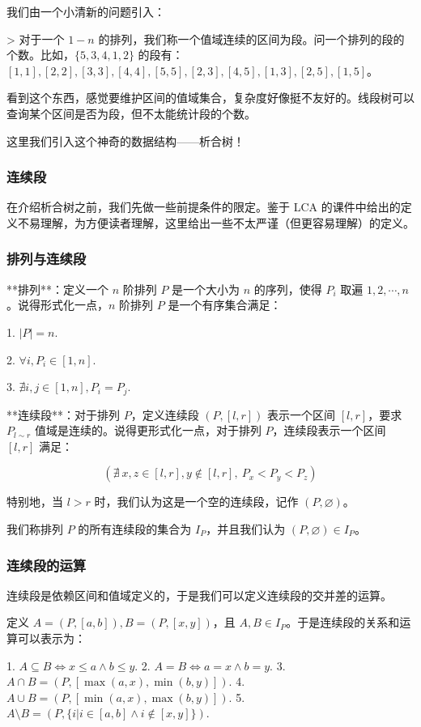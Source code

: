 \documentclass[12pt]{ctexart}
\begin{document}
我们由一个小清新的问题引入：

> 对于一个 $1-n$ 的排列，我们称一个值域连续的区间为段。问一个排列的段的个数。比如，$\{5 ,3 ,4, 1 ,2\}$ 的段有：$[1,1],[2,2],[3,3],[4,4],[5,5],[2,3],[4,5],[1,3],[2,5],[1,5]$。

看到这个东西，感觉要维护区间的值域集合，复杂度好像挺不友好的。线段树可以查询某个区间是否为段，但不太能统计段的个数。

这里我们引入这个神奇的数据结构——析合树！

\subsubsection{连续段}

在介绍析合树之前，我们先做一些前提条件的限定。鉴于 LCA 的课件中给出的定义不易理解，为方便读者理解，这里给出一些不太严谨（但更容易理解）的定义。

\subsubsection{排列与连续段}

**排列**：定义一个 $n$ 阶排列 $P$ 是一个大小为 $n$ 的序列，使得 $P_i$ 取遍 $1,2,\cdots,n$。说得形式化一点，$n$ 阶排列 $P$ 是一个有序集合满足：

1. $|P|=n$.

2. $\forall i,P_i\in[1,n]$.

3. $\nexists i,j\in[1,n],P_i=P_j$.

   **连续段**：对于排列 $P$，定义连续段 $(P,[l,r])$ 表示一个区间 $[l,r]$，要求 $P_{l\sim r}$ 值域是连续的。说得更形式化一点，对于排列 $P$，连续段表示一个区间 $[l,r]$ 满足：

$$
(\nexists\ x,z\in[l,r],y\notin[l,r],\ P_x<P_y<P_z)
$$

特别地，当 $l>r$ 时，我们认为这是一个空的连续段，记作 $(P,\varnothing)$。

我们称排列 $P$ 的所有连续段的集合为 $I_P$，并且我们认为 $(P,\varnothing)\in I_P$。

\subsubsection{连续段的运算}

连续段是依赖区间和值域定义的，于是我们可以定义连续段的交并差的运算。

定义 $A=(P,[a,b]),B=(P,[x,y])$，且 $A,B\in I_P$。于是连续段的关系和运算可以表示为：

1. $A\subseteq B\iff x\le a\wedge b\le y$.
2. $A=B\iff a=x\wedge b=y$.
3. $A\cap B=(P,[\max(a,x),\min(b,y)])$.
4. $A\cup B=(P,[\min(a,x),\max(b,y)])$.
5. $A\setminus B=(P,\{i|i\in[a,b]\wedge i\notin[x,y]\})$.
\end{document}
